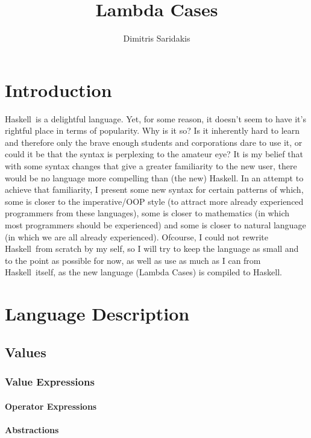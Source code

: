 \documentclass{article}
\date{}
\author{
  Dimitris Saridakis
}
\def\H{Haskell}
\begin{document}
\title{
\textbf{Lambda Cases}
}
\maketitle

\section{Introduction}

\H\ is a delightful language. Yet, for some reason, it doesn't seem to have it's 
rightful place in terms of popularity. Why is it so? Is it inherently hard to learn
and therefore only the brave enough students and corporations dare to use it, or
could it be that the syntax is perplexing to the amateur eye? It is my belief that 
with some syntax changes that give a greater familiarity to the new user, there
would be no language more compelling than (the new) \H. In an attempt to achieve
that familiarity, I present some new syntax for certain patterns of which,
some is closer to the imperative/OOP style (to attract more already experienced
programmers from these languages), some is closer to mathematics (in which most 
programmers should be experienced) and some is closer to natural language
(in which we are all already experienced). Ofcourse, I could not rewrite \H\
from scratch by my self, so I will try to keep the language as small and to the 
point as possible for now, as well as use as much as I can from \H\ itself, as 
the new language (Lambda Cases) is compiled to \H.

\section{Language Description}

\subsection{Values}

\subsubsection{Value Expressions}

\paragraph{Operator Expressions}

\paragraph{Abstractions}
\end{document}
